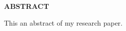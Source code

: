 
\newenvironment{myabstract}
{%
    \thispagestyle{empty}%
    \vspace*{\stretch{2}}%
    \justifying      %
}
{\par %
    \vspace{\stretch{3}} %
    \clearpage           %
}

\section*{}
\begin{myabstract}
    \begin{center}
        {\textbf{ABSTRACT}}
    \end{center}
    This an abstract of my research paper.
\end{myabstract}